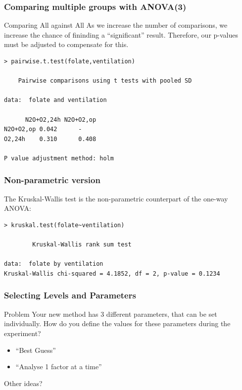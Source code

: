 \documentclass[10pt]{beamer}
\begin{document}
\begin{frame}
  \frametitle{Comparing multiple groups with ANOVA(3)}
  \begin{block}{Comparing All against All}
    As we increase the number of comparisons, we increase the chance
    of fininding a ``significant'' result. Therefore, our p-values
    must be adjusted to compensate for this.
  \end{block}
  \begin{block}{}
\begin{verbatim}
> pairwise.t.test(folate,ventilation)

    Pairwise comparisons using t tests with pooled SD 

data:  folate and ventilation 

      N2O+O2,24h N2O+O2,op
N2O+O2,op 0.042      -        
O2,24h    0.310      0.408    

P value adjustment method: holm
\end{verbatim}
  \end{block}
\end{frame}

\begin{frame}
  \frametitle{Non-parametric version}
  The Kruskal-Wallis test is the non-parametric counterpart of the one-way ANOVA:
  \begin{block}{}
\begin{verbatim}
> kruskal.test(folate~ventilation)

        Kruskal-Wallis rank sum test

data:  folate by ventilation 
Kruskal-Wallis chi-squared = 4.1852, df = 2, p-value = 0.1234
\end{verbatim}
  \end{block}
\end{frame}

\begin{frame}
  \frametitle{Selecting Levels and Parameters}
  \begin{block}{Problem}
    Your new method has 3 different parameters, that can be set
    individually. How do you define the values for these parameters
    during the experiment?
  \end{block}
  \begin{itemize}
  \item ``Best Guess''
  \item ``Analyse 1 factor at a time''
  \end{itemize}
  Other ideas? 
\end{frame}
\end{document}
